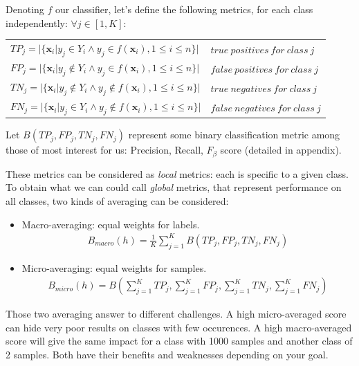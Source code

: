 Denoting $f$ our classifier, let's define the following metrics, for each class independently:
$\forall j \in [1, K]$:
{\ttfamily
\begin{table}[H]
    \centering
    \begin{tabular}{ll}
        \toprule
        $TP_j = |\{ \mathbf{x}_i | y_j \in Y_i \wedge y_j \in f(\mathbf{x}_i), 1 \leq i \leq n \}|$          &    $true\ positives\ for\ class\ j$ \\
        $FP_j = |\{ \mathbf{x}_i | y_j \notin Y_i \wedge y_j \in f(\mathbf{x}_i), 1 \leq i \leq n \}|$          &    $false\ positives\ for\ class\ j$ \\
        $TN_j = |\{ \mathbf{x}_i | y_j \notin Y_i \wedge y_j \notin f(\mathbf{x}_i), 1 \leq i \leq n \}|$       &    $true\ negatives\ for\ class\ j$  \\
        $FN_j = |\{ \mathbf{x}_i | y_j \in Y_i \wedge y_j \notin f(\mathbf{x}_i), 1 \leq i \leq n \}|$       &    $false\ negatives\ for\ class\ j$  \\
        \bottomrule
    \end{tabular}
\end{table}
}

Let $B(TP_j, FP_j, TN_j, FN_j)$ represent some binary classification metric among those of most interest for us: Precision, Recall, $F_{\beta}$ score (detailed in appendix). 

These metrics can be considered as \textit{local} metrics: each is specific to a given class. To obtain what we can could call \textit{global} metrics, that represent performance on all classes, two kinds of averaging can be considered:

\begin{itemize}
	\item Macro-averaging: equal weights for labels.
	\begin{align}
		B_{macro}(h) = \frac{1}{K}\sum_{j=1}^K B(TP_j, FP_j, TN_j, FN_j)
	\end{align}
	\item Micro-averaging: equal weights for samples.
	\begin{align}
		B_{micro}(h) = B(\sum_{j=1}^K TP_j, \sum_{j=1}^K FP_j,\sum_{j=1}^K  TN_j,\sum_{j=1}^K  FN_j)
	\end{align}
\end{itemize}


Those two averaging answer to different challenges. A high micro-averaged score can hide very poor results on classes with few occurences. A high macro-averaged score will give the same impact for a class with 1000 samples and another class of 2 samples. Both have their benefits and weaknesses depending on your goal.

